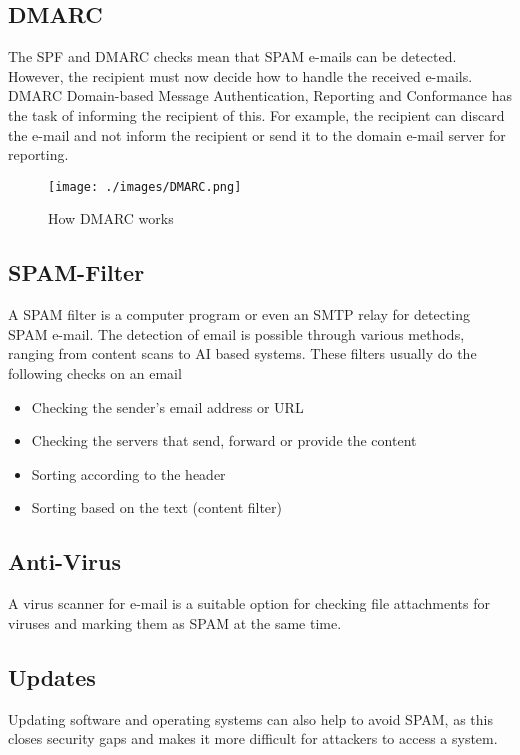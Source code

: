 \subsection{DMARC}
The SPF and DMARC checks mean that SPAM e-mails can be detected.
However, the recipient must now decide how to handle the received e-mails.
DMARC Domain-based Message Authentication, Reporting and Conformance has the task of informing the recipient of this.
For example, the recipient can discard the e-mail and not inform the recipient or send it to the domain e-mail server for reporting.

\begin{figure}[H]
    \centering
    \texttt{[image: ./images/DMARC.png]}
    \caption{How DMARC works}
\end{figure}


\subsection{SPAM-Filter}
A SPAM filter is a computer program or even an SMTP relay for detecting SPAM e-mail.
The detection of email is possible through various methods, ranging from content scans to AI based systems.
These filters usually do the following checks on an email

\begin{itemize}
    \item Checking the sender's email address or URL
    \item Checking the servers that send, forward or provide the content
    \item Sorting according to the header
    \item Sorting based on the text (content filter)
\end{itemize}


\subsection{Anti-Virus}
A virus scanner for e-mail is a suitable option for checking file attachments for viruses and marking them as SPAM at the same time.

\subsection{Updates}
Updating software and operating systems can also help to avoid SPAM, as this closes security gaps and makes it more difficult for attackers to access a system.

